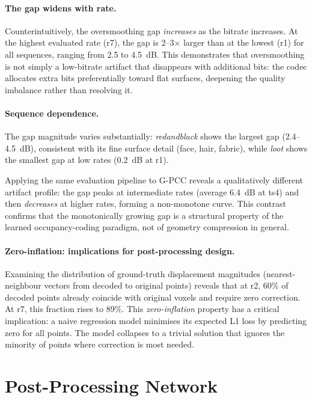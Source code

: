 \paragraph{The gap widens with rate.}
Counterintuitively, the oversmoothing gap \emph{increases} as the bitrate
increases.
At the highest evaluated rate (r7), the gap is 2--3$\times$ larger than at
the lowest (r1) for all sequences, ranging from 2.5 to 4.5~dB.
This demonstrates that oversmoothing is not simply a low-bitrate artifact
that disappears with additional bits: the codec allocates extra bits
preferentially toward flat surfaces, deepening the quality imbalance rather
than resolving it.

\paragraph{Sequence dependence.}
The gap magnitude varies substantially: \textit{redandblack} shows the largest
gap (2.4--4.5~dB), consistent with its fine surface detail (face, hair, fabric),
while \textit{loot} shows the smallest gap at low rates (0.2~dB at r1).

Applying the same evaluation pipeline to G-PCC reveals a qualitatively different
artifact profile: the gap peaks at intermediate rates (average 6.4~dB at ts4)
and then \emph{decreases} at higher rates, forming a non-monotone curve.
This contrast confirms that the monotonically growing gap is a structural
property of the learned occupancy-coding paradigm, not of geometry compression
in general.

\paragraph{Zero-inflation: implications for post-processing design.}
Examining the distribution of ground-truth displacement magnitudes
(nearest-neighbour vectors from decoded to original points) reveals that at
r2, 60\% of decoded points already coincide with original voxels and require
zero correction.
At r7, this fraction rises to 89\%.
This \emph{zero-inflation} property has a critical implication: a naive
regression model minimises its expected L1 loss by predicting zero for all
points.
The model collapses to a trivial solution that ignores the minority of points
where correction is most needed.

\section*{Post-Processing Network}

